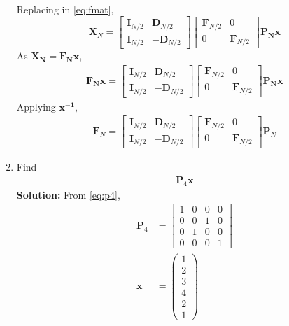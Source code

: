 \documentclass[journal,12pt,twocolumn]{IEEEtran}
\newcommand{\solution}{\noindent \textbf{Solution: }}
\let\vec\mathbf
\numberwithin{equation}{section}
\renewcommand\thesection{\arabic{section}}
\newcommand{\myvec}[1]{\ensuremath{\begin{pmatrix}#1\end{pmatrix}}}
\begin{document}
\begin{enumerate}[label=\arabic*.,ref=\thesection.\theenumi]
\begin{align}
\end{align}
Replacing in \eqref{eq:fmat},
 \begin{equation}
\vec{X}_{N}=
\begin{bmatrix}
\vec{I}_{N/2} & \vec{D}_{N/2} \\
\vec{I}_{N/2} & -\vec{D}_{N/2}
\end{bmatrix}
\begin{bmatrix}
\vec{F}_{N/2} & 0 \\
0 & \vec{F}_{N/2}
\end{bmatrix}\vec{P_N}\vec{x}
\end{equation}
As $\vec{X_N}=\vec{F_N}\vec{x}$,
\begin{align}
\vec{F_N}\vec{x}=
\begin{bmatrix}
\vec{I}_{N/2} & \vec{D}_{N/2} \\
\vec{I}_{N/2} & -\vec{D}_{N/2}
\end{bmatrix}
\begin{bmatrix}
\vec{F}_{N/2} & 0 \\
0 & \vec{F}_{N/2}
\end{bmatrix}\vec{P_N}\vec{x}
\end{align}
Applying $\vec{x^{-1}}$,
\begin{align}
\label{eq:final}
\vec{F}_{N}=
\begin{bmatrix}
\vec{I}_{N/2} & \vec{D}_{N/2} \\
\vec{I}_{N/2} & -\vec{D}_{N/2}
\end{bmatrix}
\begin{bmatrix}
\vec{F}_{N/2} & 0 \\
0 & \vec{F}_{N/2}
\end{bmatrix}
\vec{P}_{N}
\end{align}
\item Find 
    \begin{align}
	     \vec{P}_4 \vec{x}
    \end{align}
\solution From \eqref{eq:p4},
\begin{align}
\vec{P}_4&=\begin{bmatrix}
1&0&0&0\\0&0&1&0\\0&1&0&0\\0&0&0&1
\end{bmatrix}\\
\vec{x}&=\myvec{1\\2\\3\\4\\2\\1}

\end{align}
\end{enumerate}
\end{document}
